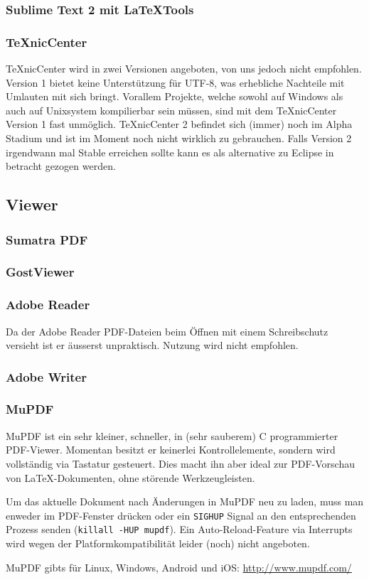 \subsubsection{Sublime Text 2 mit LaTeXTools}

\subsubsection{TeXnicCenter}
TeXnicCenter wird in zwei Versionen angeboten, von uns jedoch nicht empfohlen. Version 1 bietet keine Unterstützung für UTF-8, was erhebliche Nachteile mit
Umlauten mit sich bringt. Vorallem Projekte, welche sowohl auf Windows als auch auf Unixsystem kompilierbar sein müssen, sind mit dem TeXnicCenter Version 1 fast unmöglich.
TeXnicCenter 2 befindet sich (immer) noch im Alpha Stadium und ist im Moment noch nicht wirklich zu gebrauchen. Falls Version 2 irgendwann mal Stable erreichen sollte kann es als
alternative zu Eclipse in betracht gezogen werden.


\subsection{Viewer}

\subsubsection{Sumatra PDF}

\subsubsection{GostViewer}

\subsubsection{Adobe Reader}
Da der Adobe Reader  PDF-Dateien beim Öffnen mit einem Schreibschutz versieht ist er äusserst unpraktisch. Nutzung wird nicht empfohlen.

\subsubsection{Adobe Writer}

\subsubsection{MuPDF}

MuPDF ist ein sehr kleiner, schneller, in (sehr sauberem) C programmierter PDF-Viewer. Momentan
besitzt er keinerlei Kontrollelemente, sondern wird vollständig via Tastatur gesteuert. Dies macht
ihn aber ideal zur PDF-Vorschau von \LaTeX-Dokumenten, ohne störende Werkzeugleisten.

Um das aktuelle Dokument nach Änderungen in MuPDF neu zu laden, muss man enweder im PDF-Fenster
 drücken oder ein \texttt{SIGHUP} Signal an den entsprechenden Prozess senden
(\texttt{killall -HUP mupdf}). Ein Auto-Reload-Feature via Interrupts wird wegen der
Platformkompatibilität leider (noch) nicht angeboten.

MuPDF gibts für Linux, Windows, Android und iOS: \url{http://www.mupdf.com/}
